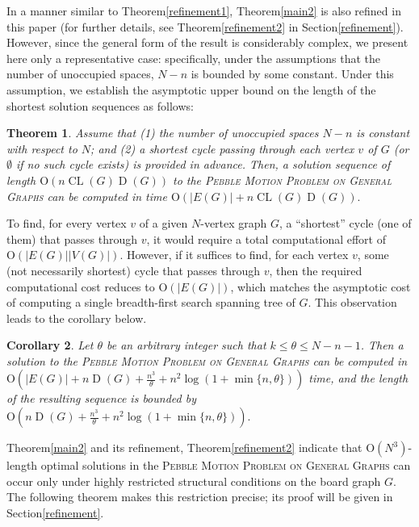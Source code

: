 \documentclass[letter,11pt]{article}
\newtheorem{thm}{Theorem}
\newtheorem{cor}[thm]{Corollary}
\theoremstyle{definition}
\theoremstyle{definition}
\DeclareMathOperator{\D}{D}
\DeclareMathOperator{\CL}{CL}
\newcommand{\1}{\boldmath$~1~$\unboldmath}
\newcommand{\Ord}{\mathrm{O}}
\newcommand{\tume}{\hspace*{0.2em}}
\begin{document}
In a manner similar to Theorem\tume\ref{refinement1}, Theorem\tume\ref{main2} is also refined in this paper 
(for further details, see Theorem\tume\ref{refinement2} in Section\tume\ref{refinement}).
However, since the general form of the result is considerably complex, we present here only a representative case:
specifically, under the assumptions that the number of unoccupied spaces, 
$N - n$ is bounded by some constant.
Under this assumption, we establish the asymptotic upper bound on the length of the shortest solution sequences as follows:
\begin{thm}\label{refinement2-general-constant-blanc}
Assume that (1) the number of unoccupied spaces $N - n$ is constant with respect to $N$;  
and  (2) a shortest cycle passing through each vertex $v$ of $G$ (or $\emptyset$ if no such cycle exists) is 
provided in advance.
Then, a solution sequence of length 
$\Ord(n \CL(G) \D(G))$
to the \textsc{Pebble Motion Problem on General Graphs} can be 
computed in time 
$\Ord(|E(G)| + n \CL(G) \D(G)).$
\end{thm}
To find, for every vertex $v$ of a given $N$-vertex graph $G$, 
a ``shortest'' cycle (one of them) that passes through $v$, 
it would require a total computational effort of $\Ord(|E(G)||V(G)|)$. 
However, if it suffices to find, for each vertex $v$, some (not necessarily shortest) 
cycle that passes through $v$, then the required computational cost reduces to 
$\Ord(|E(G)|)$, which matches the asymptotic cost of computing
a single breadth-first search spanning tree of $G$. 
This observation leads to the corollary below.
\begin{cor}\label{main2-cor}
Let $\theta$ be an arbitrary integer such that $k \leq \theta \leq N - n - 1$.
Then a solution to the \textsc{Pebble Motion Problem on General Graphs} can be computed in 
$\Ord(|E(G)|+n\D(G)+\frac{n^3}{\theta}+n^2\log(1+\min\{n, \theta\}))$ time, and the length of the resulting 
sequence is bounded by $\Ord(n\D(G)+\frac{n^3}{\theta}+n^2\log(1+\min\{n, \theta\})).$
\end{cor}

Theorem\tume\ref{main2} and its refinement, Theorem\tume\ref{refinement2}
indicate that $\Ord(N^3)$-length optimal solutions in the
\textsc{Pebble Motion Problem on General Graphs}
can occur only under highly restricted structural conditions
on the board graph $G$.
The following theorem makes this restriction precise;
its proof will be given in Section\tume\ref{refinement}.
\end{document}
